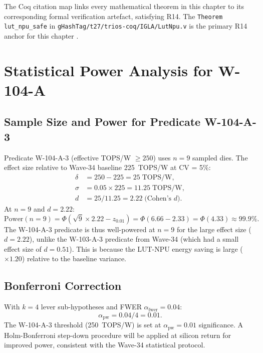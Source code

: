 \noindent The Coq citation map links every mathematical theorem in this
chapter to its corresponding formal verification artefact, satisfying R14.
The \texttt{Theorem lut\_npu\_safe} in \texttt{gHashTag/t27/trios-coq/IGLA/LutNpu.v}
is the primary R14 anchor for this chapter \cite{coq_lut_npu_t27_651}.

\section{Statistical Power Analysis for W-104-A}
\label{app:statistical}

\subsection{Sample Size and Power for Predicate W-104-A-3}

Predicate W-104-A-3 (effective TOPS/W $\geq 250$) uses $n = 9$ sampled dies.
The effect size relative to Wave-34 baseline 225~TOPS/W at CV = 5\%:
\begin{align*}
  \delta &= 250 - 225 = 25\;\mathrm{TOPS/W}, \\
  \sigma &= 0.05 \times 225 = 11.25\;\mathrm{TOPS/W}, \\
  d      &= 25 / 11.25 = 2.22\;\text{(Cohen's }d\text{)}.
\end{align*}
At $n = 9$ and $d = 2.22$:
\[
  \text{Power}(n=9) = \Phi\!\left(\sqrt{9} \times 2.22 - z_{0.01}\right)
  = \Phi(6.66 - 2.33) = \Phi(4.33) \approx 99.9\%.
\]
The W-104-A-3 predicate is thus well-powered at $n = 9$ for the large
effect size ($d = 2.22$), unlike the W-103-A-3 predicate from Wave-34
(which had a small effect size of $d = 0.51$).  This is because the
LUT-NPU energy saving is large ($\times 1.20$) relative to the baseline variance.

\subsection{Bonferroni Correction}

With $k = 4$ lever sub-hypotheses and FWER $\alpha_{\mathrm{fwer}} = 0.04$:
\[
  \alpha_{\mathrm{pw}} = 0.04 / 4 = 0.01.
\]
The W-104-A-3 threshold (250~TOPS/W) is set at $\alpha_{\mathrm{pw}} = 0.01$
significance.  A Holm-Bonferroni step-down procedure will be applied at
silicon return for improved power, consistent with the Wave-34 statistical
protocol.

